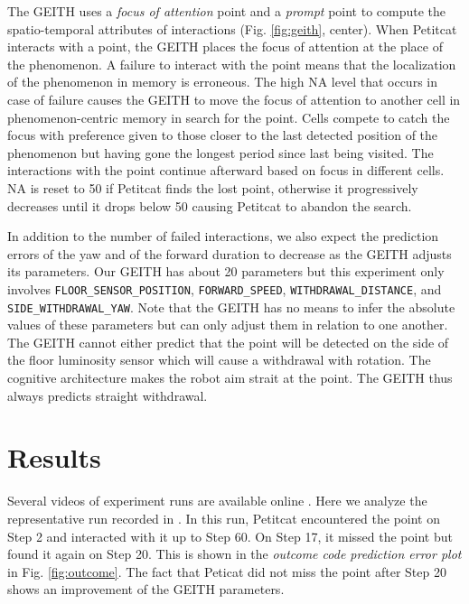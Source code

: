 \documentclass[runningheads]{llncs}
\begin{document}
The GEITH uses a \textit{focus of attention} point and a \textit{prompt} point to compute the spatio-temporal attributes of interactions (Fig. \ref{fig:geith}, center). 
When Petitcat interacts with a point, the GEITH places the focus of attention at the place of the phenomenon. 
A failure to interact with the point means that the localization of the phenomenon in memory is erroneous. 
The high NA level that occurs in case of failure causes the GEITH to move the focus of attention to another cell in phenomenon-centric memory in search for the point.
Cells compete to catch the focus with preference given to those closer to the last detected position of the phenomenon but having gone the longest period since last being visited.
The interactions with the point continue afterward based on focus in different cells. 
NA is reset to 50 if Petitcat finds the lost point, otherwise it progressively decreases until it drops below 50 causing Petitcat to abandon the search. 

In addition to the number of failed interactions, we also expect the prediction errors of the yaw and of the forward duration to decrease as the GEITH adjusts its parameters. 
Our GEITH has about 20 parameters but this experiment only involves \texttt{FLOOR\_SENSOR\_POSITION}, \texttt{FORWARD\_SPEED}, \texttt{WITHDRAWAL\_DIS\-TANCE}, and \texttt{SIDE\_WITH\-DRA\-WAL\_YAW}.
Note that the GEITH has no means to infer the absolute values of these parameters but can only adjust them in relation to one another.
The GEITH cannot either predict that the point will be detected on the side of the floor luminosity sensor which will cause a withdrawal with rotation. 
The cognitive architecture makes the robot aim strait at the point.
The GEITH thus always predicts straight withdrawal. 



\section{Results}
\label{sec:results}

Several videos of experiment runs are available online \cite{georgeon_petitcat_playlist}. 
Here we analyze the representative run recorded in \cite{georgeon_petitcat_2024}.
In this run, Petitcat encountered the point on Step 2 and interacted with it up to Step 60.
On Step 17, it missed the point but found it again on Step 20.
This is shown in the \textit{outcome code prediction error plot} in Fig. \ref{fig:outcome}. 
The fact that Peticat did not miss the point after Step 20 shows an improvement of the GEITH parameters.
\end{document}
